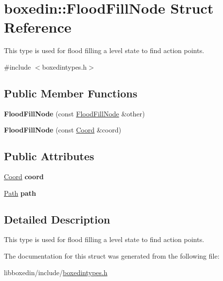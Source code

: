 \hypertarget{structboxedin_1_1FloodFillNode}{\section{boxedin\+:\+:Flood\+Fill\+Node Struct Reference}
\label{structboxedin_1_1FloodFillNode}
}


This type is used for flood filling a level state to find action points.  




{\ttfamily \#include $<$boxedintypes.\+h$>$}

\subsection*{Public Member Functions}
\begin{DoxyCompactItemize}
\item 
\hypertarget{structboxedin_1_1FloodFillNode_a379f627d3462d4e52e21c17f234090c9}{{\bfseries Flood\+Fill\+Node} (const \hyperlink{structboxedin_1_1FloodFillNode}{Flood\+Fill\+Node} \&other)}\label{structboxedin_1_1FloodFillNode_a379f627d3462d4e52e21c17f234090c9}

\item 
\hypertarget{structboxedin_1_1FloodFillNode_a81bbe005b4b838db0bf9a84c605d2f4b}{{\bfseries Flood\+Fill\+Node} (const \hyperlink{namespaceboxedin_afc0dedc740afcefb60a4dac20d984b16}{Coord} \&coord)}\label{structboxedin_1_1FloodFillNode_a81bbe005b4b838db0bf9a84c605d2f4b}

\end{DoxyCompactItemize}
\subsection*{Public Attributes}
\begin{DoxyCompactItemize}
\item 
\hypertarget{structboxedin_1_1FloodFillNode_ae9acd67dcc08879c13c34413e0e52860}{\hyperlink{namespaceboxedin_afc0dedc740afcefb60a4dac20d984b16}{Coord} {\bfseries coord}}\label{structboxedin_1_1FloodFillNode_ae9acd67dcc08879c13c34413e0e52860}

\item 
\hypertarget{structboxedin_1_1FloodFillNode_aa8b8cc7fc044e24fb8002c5c28e59ff8}{\hyperlink{namespaceboxedin_ab79d3e8d943aa2875e3adb42b8917ff7}{Path} {\bfseries path}}\label{structboxedin_1_1FloodFillNode_aa8b8cc7fc044e24fb8002c5c28e59ff8}

\end{DoxyCompactItemize}


\subsection{Detailed Description}
This type is used for flood filling a level state to find action points. 

The documentation for this struct was generated from the following file\+:\begin{DoxyCompactItemize}
\item 
libboxedin/include/\hyperlink{boxedintypes_8h}{boxedintypes.\+h}\end{DoxyCompactItemize}
